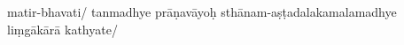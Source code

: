 \begin{ekdosis}
\begin{prose}
{{          }
        matir-bhavati/} %
        tanmadhye prāṇavāyoḥ sthānam-aṣṭadalakamalamadhye liṃgākārā
        kathyate/   

\end{prose}
\end{ekdosis}
